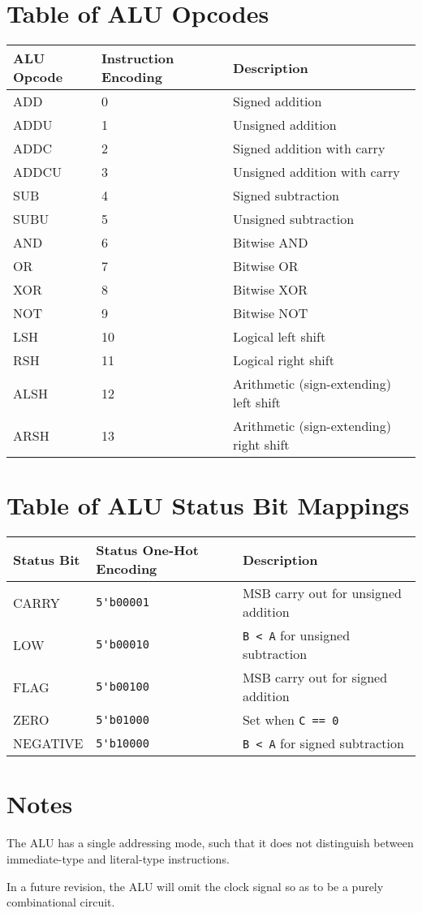 \documentclass[conference]{IEEEtran}
\begin{document}
\section{Table of ALU Opcodes}
\begin{center}
\begin{tabular}{ | P{5em} | P{5em} | P{12em} | }
\hline
\textbf{ALU Opcode} & \textbf{Instruction Encoding} & \textbf{Description} \\
\hline
ADD & 0 & Signed addition \\
\hline
ADDU & 1 & Unsigned addition \\
\hline
ADDC & 2 & Signed addition with carry \\
\hline
ADDCU & 3 & Unsigned addition with carry \\
\hline
SUB & 4 & Signed subtraction \\
\hline
SUBU & 5 & Unsigned subtraction \\
\hline
AND & 6 & Bitwise AND \\
\hline
OR & 7 & Bitwise OR \\
\hline
XOR & 8 & Bitwise XOR \\
\hline
NOT & 9 & Bitwise NOT \\
\hline
LSH & 10 & Logical left shift \\
\hline
RSH & 11 & Logical right shift \\
\hline
ALSH & 12 & Arithmetic (sign-extending) left shift \\
\hline
ARSH & 13 & Arithmetic (sign-extending) right shift \\
\hline
\end{tabular}
\end{center}

\vspace{0.2in}
\section{Table of ALU Status Bit Mappings}
\begin{center}
\begin{tabular}{ | P{5em} | P{5em} | P{12em} | }
\hline
\textbf{Status Bit} & \textbf{Status One-Hot Encoding} & \textbf{Description} \\
\hline
CARRY & \verb|5'b00001| & MSB carry out for unsigned addition \\
\hline
LOW & \verb|5'b00010| & \verb|B < A| for unsigned subtraction \\
\hline
FLAG & \verb|5'b00100| & MSB carry out for signed addition \\
\hline
ZERO & \verb|5'b01000| & Set when \verb|C == 0| \\
\hline
NEGATIVE & \verb|5'b10000| & \verb|B < A| for signed subtraction \\
\hline
\end{tabular}
\end{center}

\section{Notes}
The ALU has a single addressing mode, such that it does not distinguish
between immediate-type and literal-type instructions.

In a future revision, the ALU will omit the clock signal so as to be a
purely combinational circuit.
\end{document}
